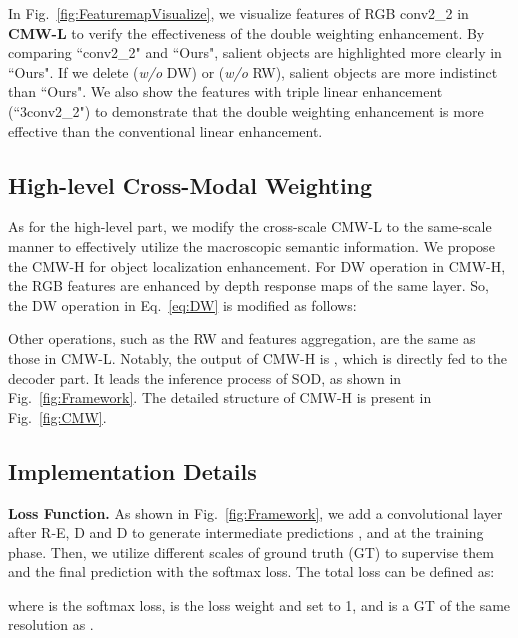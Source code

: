 \documentclass[runningheads]{llncs}
\begin{document}
In Fig.~\ref{fig:FeaturemapVisualize}, we visualize features of
RGB conv2\_2 in \textbf{CMW-L} to verify the effectiveness of
the double weighting enhancement.
By comparing ``conv2\_2" and ``Ours", salient objects are
highlighted more clearly in ``Ours".
If we delete  (\textit{w/o} DW) or
 (\textit{w/o} RW), salient objects are more indistinct than ``Ours".
We also show the features with triple linear enhancement (``3conv2\_2") to
demonstrate that the double weighting enhancement is more effective
than the conventional linear enhancement.



\subsection{High-level Cross-Modal Weighting}
\label{sec:CW}
As for the high-level part, we modify the cross-scale CMW-L to the same-scale 
manner to effectively utilize the macroscopic semantic information.
We propose the CMW-H for object localization enhancement.
For DW operation in CMW-H, the RGB features are enhanced by
depth response maps of the same layer.
So, the DW operation in Eq.~\ref{eq:DW} is modified as follows:

Other operations, such as the RW and features aggregation,
are the same as those in CMW-L.
Notably, the output of CMW-H is ,
which is directly fed to the decoder part.
It leads the inference process of SOD,
as shown in Fig.~\ref{fig:Framework}.
The detailed structure of CMW-H is present in Fig.~\ref{fig:CMW}.



\subsection{Implementation Details}
\label{sec:Details}

\noindent\textbf{Loss Function.}
As shown in Fig.~\ref{fig:Framework}, we add a convolutional layer after
R-E, D and D to generate
intermediate predictions ,  and  at the
training phase.
Then, we utilize different scales of ground truth (GT) to supervise them
and the final prediction  with the softmax loss.
The total loss  can be defined as:

where  is the softmax loss,
 is the loss weight and set to 1,
and  is a GT of the same resolution as .
\end{document}
